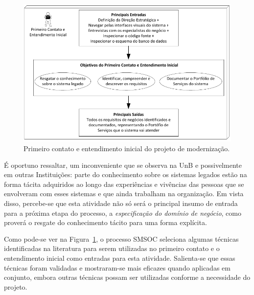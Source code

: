 \begin{figure}[htb]
\centering
\includegraphics[scale=1]{img/processo/primeiro_contato.pdf}
\caption{Primeiro contato e entendimento inicial do projeto de modernização.}
\label{fig:primeiro_contato}
\end{figure}


É oportuno ressaltar,
um inconveniente 
que se observa na \acrshort{UnB} e 
possivelmente em outras Instituições: 
parte do conhecimento
sobre os sistemas legados
estão na forma tácita adquiridos ao 
longo das experiências e vivências 
das pessoas que se envolveram com esses sistemas 
e que ainda trabalham na organização.
Em vista disso, percebe-se que esta atividade não só 
será o principal insumo de entrada para a próxima etapa
do processo, a \emph{especificação do domínio de negócio},
como proverá o resgate 
do conhecimento tácito
para uma forma explícita.

Como pode-se ver na Figura~\ref{fig:primeiro_contato},
o processo \acrshort{SMSOC} 
seleciona algumas técnicas identificadas na literatura
para serem utilizadas no 
primeiro contato e o entendimento inicial como 
entradas para esta atividade. Salienta-se que 
essas técnicas foram validadas 
e mostraram-se mais eficazes 
quando aplicadas
em conjunto, embora outras técnicas possam 
ser utilizadas conforme a necessidade do projeto.

